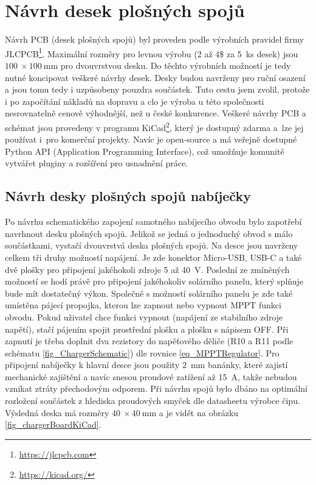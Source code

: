 \chapter{Návrh desek plošných spojů}

Návrh PCB (desek plošných spojů) byl proveden podle výrobních pravidel firmy JLCPCB\footnote{\url{https://jlcpcb.com}}. Maximální rozměry pro levnou výrobu (2 až 4\$ za 5~ks desek) jsou $\SI{100}{}\times \SI{100}{\milli\metre}$ pro dvouvrstvou desku. Do těchto výrobních možností je tedy nutné koncipovat veškeré návrhy desek. Desky budou navrženy pro ruční osazení a jsou tomu tedy i uzpůsobeny pouzdra součástek. Tuto cestu jsem zvolil, protože i po započítání nákladů na dopravu a clo je výroba u této společnosti nesrovnatelně cenově výhodnější, než u české konkurence. Veškeré návrhy PCB a schémat jsou provedeny v programu KiCad\footnote{\url{https://kicad.org/}}, který je dostupný zdarma a~lze jej používat i~pro komerční projekty. Navíc je open-source a má veřejně dostupné Python API (Application Programming Interface), což umožňuje komunitě vytvářet pluginy a rozšíření pro usnadnění práce.

\section{Návrh desky plošných spojů nabíječky}

Po návrhu schematického zapojení samotného nabíjecího obvodu bylo zapotřebí navrhnout desku plošných spojů. Jelikož se jedná o jednoduchý obvod s málo součástkami, vystačí dvouvrstvá deska plošných spojů. Na desce jsou navrženy celkem tři druhy možností napájení. Je zde konektor Micro-USB, USB-C a také dvě plošky pro připojení jakéhokoli zdroje \SI{5}{} až \SI{40}{\volt}. Poslední ze zmíněných možností se hodí právě pro připojení jakéhokoliv solárního panelu, který splňuje bude mít dostatečný výkon. Společně s možností solárního panelu je zde také umístěna pájecí propojka, kterou lze zapnout nebo vypnout MPPT funkci obvodu. Pokud uživatel chce funkci vypnout (napájení ze stabilního zdroje napětí), stačí pájením spojit prostřední plošku a plošku s nápisem OFF. Při zapnutí je třeba doplnit dva rezistory do napěťového děliče (R10 a R11 podle schématu \ref{fig_ChargerSchematic}) dle rovnice \ref{eq_MPPTRegulator}. Pro připojení nabíječky k hlavní desce jsou použity \SI{2}{\milli\metre} banánky, které zajistí mechanické zajištění a navíc snesou proudové zatížení až \SI{15}{\ampere}, takže nebudou vznikat ztráty přechodovým odporem. Při návrhu spojů bylo dbáno na optimální rozložení součástek z hlediska proudových smyček dle datasheetu výrobce čipu. Výsledná deska má rozměry $\SI{40}{}\times \SI{40}{\milli\metre}$ a je vidět na obrázku \ref{fig_chargerBoardKiCad}.

